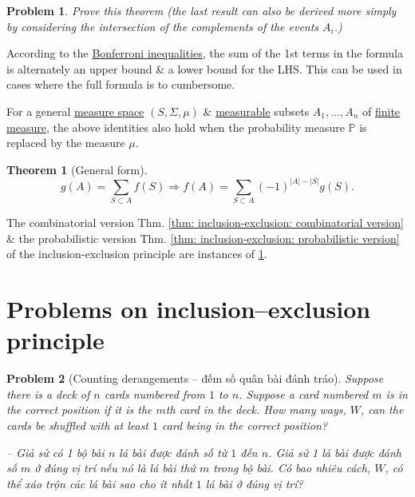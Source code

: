 \documentclass[oneside]{book}
\newtheorem{problem}{Problem}
\newtheorem{theorem}{Theorem}
\begin{document}
\begin{problem}
	Prove this theorem (the last result can also be derived more simply by considering the intersection of the complements of the events $A_i$.)
\end{problem}
According to the \href{https://en.wikipedia.org/wiki/Boole%27s_inequality#Bonferroni_inequalities}{Bonferroni inequalities}, the sum of the 1st terms in the formula is alternately an upper bound \& a lower bound for the LHS. This can be used in cases where the full formula is to cumbersome.

For a general \href{https://en.wikipedia.org/wiki/Measure_space}{measure space} $(S,\Sigma,\mu)$ \& \href{https://en.wikipedia.org/wiki/Measurable}{measurable} subsets $A_1,\ldots,A_n$ of \href{https://en.wikipedia.org/wiki/Finite_measure}{finite measure}, the above identities also hold when the probability measure $\mathbb{P}$ is replaced by the measure $\mu$.

\begin{theorem}[General form]
	\label{thm: inclusion-exclusion: general form}
	\begin{equation*}
		g(A) = \sum_{S\subset A} f(S)\Rightarrow f(A) = \sum_{S\subset A} (-1)^{|A| - |S|}g(S).
	\end{equation*}
\end{theorem}
The combinatorial version Thm. \ref{thm: inclusion-exclusion: combinatorial version} \& the probabilistic version Thm. \ref{thm: inclusion-exclusion: probabilistic version} of the inclusion-exclusion principle are instances of \ref{thm: inclusion-exclusion: general form}.


\section{Problems on inclusion--exclusion principle}

\begin{problem}[Counting derangements -- đếm số quân bài đánh tráo]
	Suppose there is a deck of $n$ cards numbered from $1$ to $n$. Suppose a card numbered $m$ is in the correct position if it is the $m$th card in the deck. How many ways, $W$, can the cards be shuffled with at least $1$ card being in the correct position?
	
	-- Giả sử có 1 bộ bài $n$ lá bài được đánh số từ $1$ đến $n$. Giả sử 1 lá bài được đánh số $m$ ở đúng vị trí nếu nó là lá bài thứ $m$ trong bộ bài. Có bao nhiêu cách, $W$, có thể xáo trộn các lá bài sao cho ít nhất $1$ lá bài ở đúng vị trí?
\end{problem}
\end{document}
